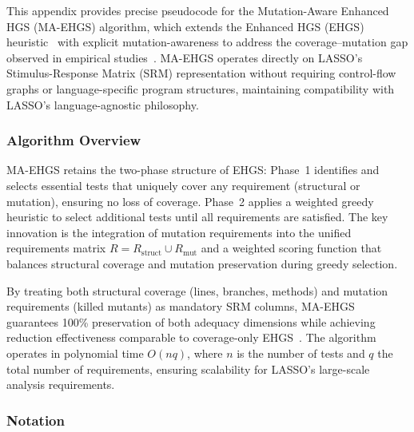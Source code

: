 \begin{appendices}
This appendix provides precise pseudocode for the Mutation-Aware Enhanced HGS (MA-EHGS) algorithm, which extends the Enhanced HGS (EHGS) heuristic~\cite{gladston2015} with explicit mutation-awareness to address the coverage--mutation gap observed in empirical studies~\cite{noemmer2020,jehan2023}. MA-EHGS operates directly on LASSO's Stimulus-Response Matrix (SRM) representation without requiring control-flow graphs or language-specific program structures, maintaining compatibility with LASSO's language-agnostic philosophy.

\subsubsection*{Algorithm Overview}

MA-EHGS retains the two-phase structure of EHGS: Phase~1 identifies and selects essential tests that uniquely cover any requirement (structural or mutation), ensuring no loss of coverage. Phase~2 applies a weighted greedy heuristic to select additional tests until all requirements are satisfied. The key innovation is the integration of mutation requirements into the unified requirements matrix $R = R_{\text{struct}} \cup R_{\text{mut}}$ and a weighted scoring function that balances structural coverage and mutation preservation during greedy selection.

By treating both structural coverage (lines, branches, methods) and mutation requirements (killed mutants) as mandatory SRM columns, MA-EHGS guarantees 100\% preservation of both adequacy dimensions while achieving reduction effectiveness comparable to coverage-only EHGS~\cite{gladston2015}. The algorithm operates in polynomial time $O(nq)$, where $n$ is the number of tests and $q$ the total number of requirements, ensuring scalability for LASSO's large-scale analysis requirements.

\subsubsection*{Notation}


\end{appendices}
